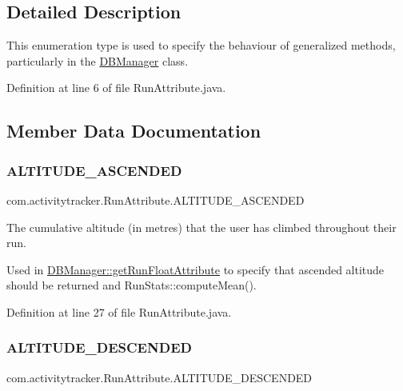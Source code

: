 \subsection{Detailed Description}
This enumeration type is used to specify the behaviour of generalized methods, particularly in the \mbox{\hyperlink{classcom_1_1activitytracker_1_1_d_b_manager}{D\+B\+Manager}} class. 

Definition at line 6 of file Run\+Attribute.\+java.



\subsection{Member Data Documentation}
\mbox{\label{enumcom_1_1activitytracker_1_1_run_attribute_abcfe85bf48187d67842a0525c1bcc0af}} 
\subsubsection{\texorpdfstring{ALTITUDE\_ASCENDED}{ALTITUDE\_ASCENDED}}
{\footnotesize\ttfamily com.\+activitytracker.\+Run\+Attribute.\+A\+L\+T\+I\+T\+U\+D\+E\+\_\+\+A\+S\+C\+E\+N\+D\+ED}

The cumulative altitude (in metres) that the user has climbed throughout their run.

Used in \mbox{\hyperlink{classcom_1_1activitytracker_1_1_d_b_manager_a666452f1e5862f90c06b0beb9a9fcfdd}{D\+B\+Manager\+::get\+Run\+Float\+Attribute}} to specify that ascended altitude should be returned and Run\+Stats\+::compute\+Mean(). 

Definition at line 27 of file Run\+Attribute.\+java.

\mbox{\label{enumcom_1_1activitytracker_1_1_run_attribute_a337a68867cfdb8ec7a17c318ad8b216b}} 
\subsubsection{\texorpdfstring{ALTITUDE\_DESCENDED}{ALTITUDE\_DESCENDED}}
{\footnotesize\ttfamily com.\+activitytracker.\+Run\+Attribute.\+A\+L\+T\+I\+T\+U\+D\+E\+\_\+\+D\+E\+S\+C\+E\+N\+D\+ED}

